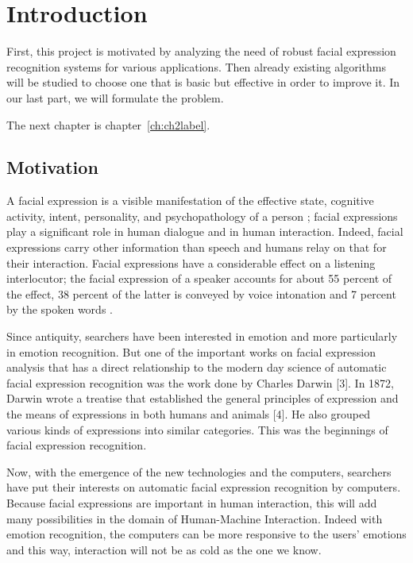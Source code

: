 \chapter{Introduction}\label{ch:introduction}

First, this project is motivated by analyzing the need of robust facial expression recognition systems for various applications. Then already existing algorithms will be studied to choose one that is basic but effective in order to improve it. In our last part, we will formulate the problem.

 The next chapter is chapter~\ref{ch:ch2label}.

\section{Motivation}

A facial expression is a visible manifestation of the effective state, cognitive activity, intent, personality, and psychopathology of a person \cite{DON99}; facial expressions play a significant role in human dialogue and in human interaction. Indeed, facial expressions carry other information than speech and humans relay on that for their interaction. Facial expressions have a considerable effect on a listening interlocutor; the facial expression of a speaker accounts for about 55 percent of the effect, 38 percent of the latter is conveyed by voice intonation and 7 percent by the spoken words \cite{PAN00}.

Since antiquity, searchers have been interested in emotion and more particularly in emotion recognition. But one of the important works on facial expression analysis that has a direct relationship to the modern day science of automatic facial expression recognition was the work done by Charles Darwin [3]. In 1872, Darwin wrote a treatise that established the general principles of expression and the means of expressions in both humans and animals [4]. He also grouped various kinds of expressions into similar categories. This was the beginnings of facial expression recognition.

Now, with the emergence of the new technologies and the computers, searchers have put their interests on automatic facial expression recognition by computers. Because facial expressions are important in human interaction, this will add many possibilities in the domain of Human-Machine Interaction. Indeed with emotion recognition, the computers can be more responsive to the users' emotions and this way, interaction will not be as cold as the one we know. 


